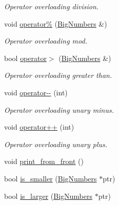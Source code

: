 \begin{DoxyCompactItemize}
\begin{DoxyCompactList}\small\item\em Operator overloading division. \end{DoxyCompactList}\item 
void \mbox{\hyperlink{classBigNumbers_a26d585ea0e5f990a7e592e0060cc06d6}{operator\%}} (\mbox{\hyperlink{classBigNumbers}{Big\+Numbers}} \&)
\begin{DoxyCompactList}\small\item\em Operator overloading mod. \end{DoxyCompactList}\item 
\mbox{\label{classBigNumbers_ad9a6ac2983843a8dfd4f140e871b3ec4}} 
bool \mbox{\hyperlink{classBigNumbers_ad9a6ac2983843a8dfd4f140e871b3ec4}{operator$>$}} (\mbox{\hyperlink{classBigNumbers}{Big\+Numbers}} \&)
\begin{DoxyCompactList}\small\item\em Operator overloading greater than. \end{DoxyCompactList}\item 
\mbox{\label{classBigNumbers_af854a4343e989377858f16639dbe5cb8}} 
void \mbox{\hyperlink{classBigNumbers_af854a4343e989377858f16639dbe5cb8}{operator-\/-\/}} (int)
\begin{DoxyCompactList}\small\item\em Operator overloading unary minus. \end{DoxyCompactList}\item 
\mbox{\label{classBigNumbers_ac7612b9a05b5aa3a6c84aa58b6e66ba3}} 
void \mbox{\hyperlink{classBigNumbers_ac7612b9a05b5aa3a6c84aa58b6e66ba3}{operator++}} (int)
\begin{DoxyCompactList}\small\item\em Operator overloading unary plus. \end{DoxyCompactList}\item 
void \mbox{\hyperlink{classBigNumbers_ae5d36fdc52a34e361f7aabcd26b2779f}{print\+\_\+from\+\_\+front}} ()
\item 
bool \mbox{\hyperlink{classBigNumbers_a507cc9d1c3a81be8bbd26b82147bef08}{is\+\_\+smaller}} (\mbox{\hyperlink{classBigNumbers}{Big\+Numbers}} $\ast$ptr)
\item 
bool \mbox{\hyperlink{classBigNumbers_a79f79dcbd53531d1b72710adc3e0edbd}{is\+\_\+larger}} (\mbox{\hyperlink{classBigNumbers}{Big\+Numbers}} $\ast$ptr)

\end{DoxyCompactItemize}
